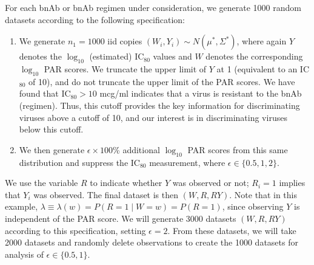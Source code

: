 \documentclass[10pt]{article}
\begin{document}
For each bnAb or bnAb regimen under consideration, we generate 1000 random datasets according to the following specification:
\begin{enumerate}
    \item We generate $n_1 = 1000$ iid copies $(W_i, Y_i) \sim N(\mu^*, \Sigma^*)$, where again $Y$ denotes the $\log_{10}$ (estimated) IC$_{80}$ values and $W$ denotes the corresponding $\log_{10}$ PAR scores. We truncate the upper limit of $Y$ at 1 (equivalent to an IC$_{80}$ of 10), and do not truncate the upper limit of the PAR scores. We have found that IC$_{80} > 10$ mcg/ml indicates that a virus is resistant to the bnAb (regimen). Thus, this cutoff provides the key information for discriminating viruses above a cutoff of 10, and our interest is in discriminating viruses below this cutoff.
    \item We then generate $\epsilon \times 100$\% additional $\log_{10}$ PAR scores from this same distribution and suppress the IC$_{80}$ measurement, where $\epsilon \in \{0.5, 1, 2\}$.
\end{enumerate}
We use the variable $R$ to indicate whether $Y$ was observed or not; $R_i = 1$ implies that $Y_i$ was observed. The final dataset is then $(W, R, RY)$. Note that in this example, $\lambda \equiv \lambda(w) = P(R = 1 \mid W = w) = P(R = 1)$, since observing $Y$ is independent of the PAR score. We will generate 3000 datasets $(W, R, RY)$ according to this specification, setting $\epsilon = 2$. From these datasets, we will take 2000 datasets and randomly delete observations to create the 1000 datasets for analysis of $\epsilon \in \{0.5, 1\}$.
\end{document}

